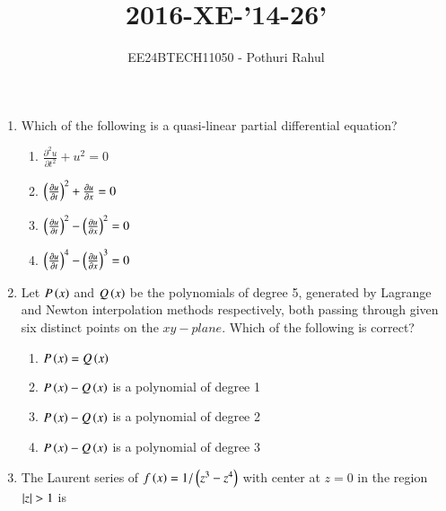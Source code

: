 \documentclass[journal]{IEEEtran}
\begin{document}

\vspace{3cm}
\title{2016-XE-'14-26'}
\author{EE24BTECH11050 - Pothuri Rahul}
{\let\newpage\relax\maketitle}
\renewcommand{\thefigure}{\theenumi}
\renewcommand{\thetable}{\theenumi}
\setlength{\intextsep}{10pt} %
\renewcommand{\thetable}{\theenumi}
\begin{enumerate}[start=4]
\item %
Which of the following is a quasi-linear partial differential equation?
\begin{enumerate}
\item $ \frac{\partial ^2 u}{\partial t^2} + u^2 = 0$
\item $ \left(\frac{\partial u}{\partial t}\right) ^2 + \frac{\partial u}{\partial x} =0$
\item $ \left(\frac{\partial u}{\partial t}\right) ^2 - \left(\frac{\partial u}{\partial x}\right) ^2 = 0$
\item $ \left(\frac{\partial u}{\partial t}\right) ^4 - \left(\frac{\partial u}{\partial x}\right) ^3 = 0$
\end{enumerate}
\item %
Let $P\left(x\right)$ and $Q\left(x\right)$ be the polynomials of degree 5, generated by Lagrange and Newton interpolation methods respectively, both passing through given six distinct points on the $xy-plane$. Which of the following is correct?
\begin{enumerate}
\item $P\left(x\right)=Q\left(x\right)$
\item $P\left(x\right) - Q\left(x\right)$ is a polynomial of degree 1
\item $P\left(x\right) - Q\left(x\right)$ is a polynomial of degree 2
\item $P\left(x\right) - Q\left(x\right)$ is a polynomial of degree 3
\end{enumerate}
\item %
The Laurent series of $ f\left(x\right)=1/\left(z^3 - z^4\right) $ with center at $z=0$ in the region $\left\vert z\right\vert>1$ is 
\begin{enumerate}
\end{enumerate}
\end{enumerate}
\end{document}
